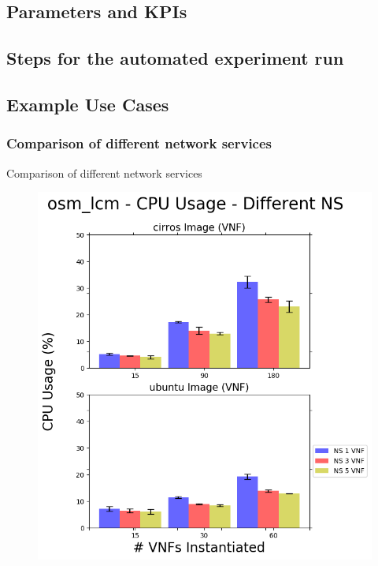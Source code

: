 \subsection{Parameters and KPIs} 

\subsection{Steps for the automated experiment run} 

\subsection{Example Use Cases}

\subsubsection{Comparison of different network services} 

Comparison of different network services

\begin{figure}[h]
	\centering
	\includegraphics[width=0.7\linewidth]{figures/scalability_graphs/Docker-Grouped-Cases/osm/osm_lcm-Mean-CPU-Cases}
	\caption{}
	\label{fig:osmlcm-mean-cpu-cases}
\end{figure}

